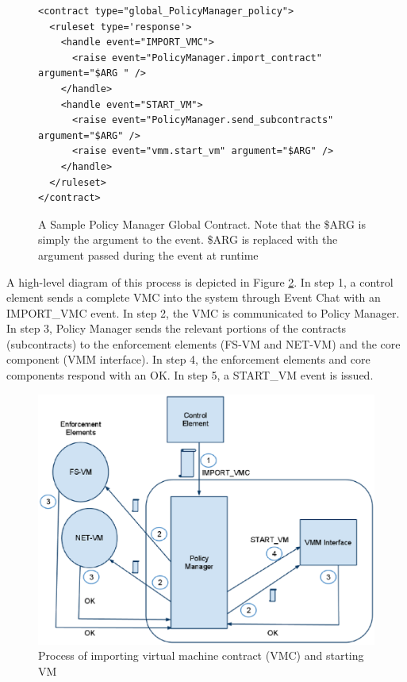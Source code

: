 \begin{figure}[tbp]
\caption{A Sample Policy Manager Global Contract. Note that the \$ARG is simply the argument to the event. \$ARG is replaced with the argument passed during the event at runtime}
\label{lst:PolicyManager_global}

\begin{lstlisting}
<contract type="global_PolicyManager_policy">
  <ruleset type='response'>
    <handle event="IMPORT_VMC">
      <raise event="PolicyManager.import_contract" argument="$ARG " />
    </handle>
    <handle event="START_VM">
      <raise event="PolicyManager.send_subcontracts" argument="$ARG" />
      <raise event="vmm.start_vm" argument="$ARG" />
    </handle>
  </ruleset>
</contract>
\end{lstlisting}
\end{figure}


A high-level diagram of this process is depicted in Figure \ref{fig:StartVM}. In step 1, a control element sends a complete VMC into the system through Event Chat with an IMPORT\_VMC event. In step 2, the VMC is communicated to Policy Manager. In step 3, Policy Manager sends the relevant portions of the contracts (subcontracts) to the enforcement elements (FS-VM and NET-VM) and the core component (VMM interface). In step 4, the enforcement elements and core components respond with an OK. In step 5, a START\_VM event is issued.

\begin{figure}[tbp]
\begin{centering}
\caption{Process of importing virtual machine contract (VMC) and starting VM}
\label{fig:StartVM}
\includegraphics[scale=.7]{figs/StartVM}
\end{centering}
\end{figure}

